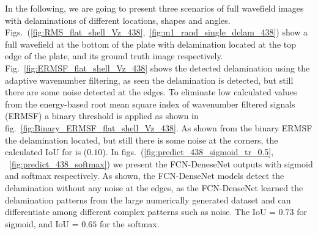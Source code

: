 	In the following, we are going to present three scenarios of full wavefield images with delaminations of different locations, shapes and angles.
	Figs.~(\ref{fig:RMS_flat_shell_Vz_438},~\ref{fig:m1_rand_single_delam_438}) show a full wavefield at the bottom of the plate with delamination located at the top edge of the plate, and its ground truth image respectively. 
	Fig.~\ref{fig:ERMSF_flat_shell_Vz_438} shows the detected delamination using the adaptive wavenumber filtering, as seen the delamination is detected, but still there are some noise detected at the edges. 
	To eliminate low calculated values from the energy-based root mean square index of wavenumber filtered signals (ERMSF) a binary threshold is applied as shown in fig.~\ref{fig:Binary_ERMSF_flat_shell_Vz_438}.
	As shown from the binary ERMSF the delamination located, but still there is some noise at the corners, the calculated IoU for is (\(0.10\)).
	In figs.~(\ref{fig:predict_438_sigmoid_tr_0.5}, ~\ref{fig:predict_438_softmax}) we present the FCN-DeneseNet outputs with sigmoid and softmax respectively.
	As shown, the FCN-DenseNet models detect the delamination without any noise at the edges, as the FCN-DenseNet learned the delamination patterns from the large numerically generated dataset and can differentiate among different complex patterns such as noise.   
	The IoU = \(0.73\) for sigmoid, and IoU = \(0.65\) for the softmax.
